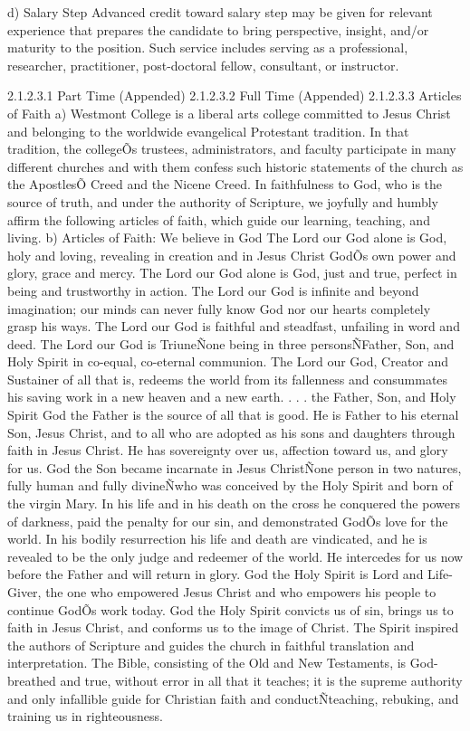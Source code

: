 \documentclass[letterpaper, 11pt]{article}
\begin{document}
d)	Salary Step Advanced credit toward salary step may be given for relevant experience that prepares the candidate to bring perspective, insight, and/or maturity to the position.  Such service includes serving as a professional, researcher, practitioner, post-doctoral fellow, consultant, or instructor.

2.1.2.3.1 Part Time (Appended)
2.1.2.3.2 Full Time (Appended)
2.1.2.3.3 Articles of Faith
a) Westmont College is a liberal arts college committed to Jesus Christ and belonging to the worldwide evangelical Protestant tradition.  In that tradition, the collegeÕs trustees, administrators, and faculty participate in many different churches and with them confess such historic statements of the church as the ApostlesÕ Creed and the Nicene Creed. In faithfulness to God, who is the source of truth, and under the authority of Scripture, we joyfully and humbly affirm the following articles of faith, which guide our learning, teaching, and living.
b) Articles of Faith:
   We believe in God
   The Lord our God alone is God, holy and loving, revealing in creation and in Jesus Christ GodÕs own power and glory, grace and mercy. The Lord our God alone is God, just and true, perfect in being and trustworthy in action.
   The Lord our God is infinite and beyond imagination; our minds can never fully know God nor our hearts completely grasp his ways. The Lord our God is faithful and steadfast, unfailing in word and deed.
   The Lord our God is TriuneÑone being in three personsÑFather, Son, and Holy Spirit in co-equal, co-eternal communion. The Lord our God, Creator and Sustainer of all that is, redeems the world from its fallenness and consummates his saving work in a new heaven and a new earth.
     . . . the Father, Son, and Holy Spirit
   God the Father is the source of all that is good. He is Father to his eternal Son, Jesus Christ, and to all who are adopted as his sons and daughters through faith in Jesus Christ. He has sovereignty over us, affection toward us, and glory for us.
   God the Son became incarnate in Jesus ChristÑone person in two natures, fully human and fully divineÑwho was conceived by the Holy Spirit and born of the virgin Mary. In his life and in his death on the cross he conquered the powers of darkness, paid the penalty for our sin, and demonstrated GodÕs love for the world.  In his bodily resurrection his life and death are vindicated, and he is revealed to be the only judge and redeemer of the world. He intercedes for us now before the Father and will return in glory.
   God the Holy Spirit is Lord and Life-Giver, the one who empowered Jesus Christ and who empowers his people to continue GodÕs work today. God the Holy Spirit convicts us of sin, brings us to faith in Jesus Christ, and conforms us to the image of Christ. The Spirit inspired the authors of  Scripture and guides the church in faithful translation and interpretation. The Bible, consisting of the Old and New Testaments, is God-breathed and true, without error in all that it teaches; it is the supreme authority and only infallible guide for Christian faith and conductÑteaching, rebuking, and training us in righteousness.
\end{document}
